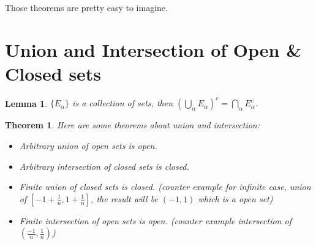\documentclass[12pt]{article}
\theoremstyle{definition}
\theoremstyle{plain}
\newtheorem{theorem}[definition]{Theorem}
\newtheorem{lemma}[definition]{Lemma}
\begin{document}
\begin{note}
Those theorems are pretty easy to imagine.
\end{note}

\section{Union and Intersection of Open \& Closed sets}

\begin{lemma}
$\{E_{\alpha}\}$ is a collection of sets, then $(\bigcup_{\alpha}E_{\alpha})^c = \bigcap_{\alpha}E^c_{\alpha}$.
\end{lemma}

\begin{theorem}
Here are some theorems about union and intersection:
\begin{itemize}
    \item Arbitrary union of open sets is open.
    \item Arbitrary intersection of closed sets is closed.
    \item Finite union of closed sets is closed. (counter example for infinite case, union of $[-1+\frac{1}{n}, 1+\frac{1}{n}]$, the result will be $(-1,1)$ which is a open set)
    \item Finite intersection of open sets is open. (counter example intersection of $(\frac{-1}{n}, \frac{1}{n})$)
\end{itemize}
\end{theorem}
\end{document}
